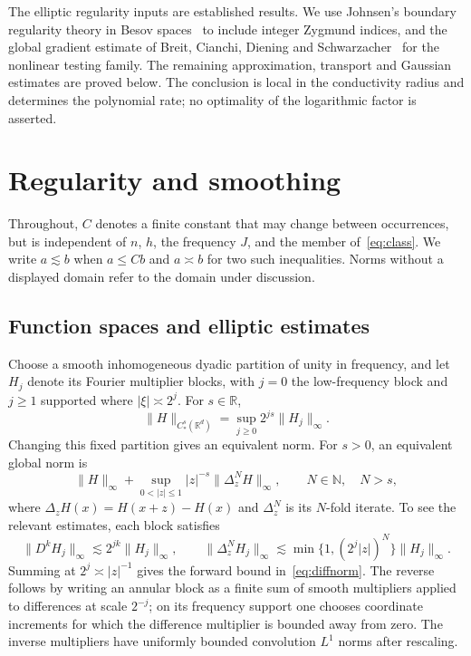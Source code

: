 \documentclass[11pt]{article}
\theoremstyle{remark}
\newcommand{\R}{\mathbb R}
\newcommand{\norm}[1]{\lVert #1\rVert}
\newcommand{\abs}[1]{\lvert #1\rvert}
\begin{document}
The elliptic regularity inputs are established results. We use Johnsen's boundary regularity theory in Besov spaces~\cite[Theorem~5.2 and Corollary~1.2]{Johnsen} to include integer Zygmund indices, and the global gradient estimate of Breit, Cianchi, Diening and Schwarzacher~\cite[Corollary~2.7]{BCDS} for the nonlinear testing family. The remaining approximation, transport and Gaussian estimates are proved below. The conclusion is local in the conductivity radius and determines the polynomial rate; no optimality of the logarithmic factor is asserted.

\section{Regularity and smoothing}\label{sec:analytic}
Throughout, $C$ denotes a finite constant that may change between occurrences, but is independent of $n$, $h$, the frequency $J$, and the member of~\eqref{eq:class}. We write $a\lesssim b$ when $a\le Cb$ and $a\asymp b$ for two such inequalities. Norms without a displayed domain refer to the domain under discussion.

\subsection{Function spaces and elliptic estimates}
Choose a smooth inhomogeneous dyadic partition of unity in frequency, and let $H_j$ denote its Fourier multiplier blocks, with $j=0$ the low-frequency block and $j\ge1$ supported where $\abs{\xi}\asymp2^j$. For $s\in\R$,
\[
 \norm{H}_{C_*^s(\R^d)}=\sup_{j\ge0}2^{js}\norm{H_j}_\infty.
\]
Changing this fixed partition gives an equivalent norm. For $s>0$, an equivalent global norm is
\begin{equation}\label{eq:diffnorm}
 \norm{H}_\infty+
 \sup_{0<\abs{z}\le1}\abs{z}^{-s}\norm{\Delta_z^N H}_\infty,
 \qquad N\in\mathbb N,\quad N>s,
\end{equation}
where $\Delta_zH(x)=H(x+z)-H(x)$ and $\Delta_z^N$ is its $N$-fold iterate. To see the relevant estimates, each block satisfies
\[
 \norm{D^kH_j}_\infty\lesssim2^{jk}\norm{H_j}_\infty,
 \qquad
 \norm{\Delta_z^NH_j}_\infty
 \lesssim\min\{1,(2^j\abs{z})^N\}\norm{H_j}_\infty.
\]
Summing at $2^j\asymp\abs{z}^{-1}$ gives the forward bound in~\eqref{eq:diffnorm}. The reverse follows by writing an annular block as a finite sum of smooth multipliers applied to differences at scale $2^{-j}$; on its frequency support one chooses coordinate increments for which the difference multiplier is bounded away from zero. The inverse multipliers have uniformly bounded convolution $L^1$ norms after rescaling.
\end{document}
